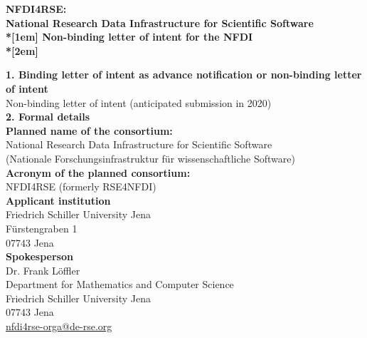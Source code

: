 \documentclass[11pt,a4paper]{scrlttr2}
\begin{document}
\newcommand{\mysec}[1]{\textbf{\hspace{-1cm}#1}\\}


\begin{letter}{}
\opening{}
\vspace{-8cm}

\begin{centering}
\textbf{\large
NFDI4RSE:\\National Research Data Infrastructure for Scientific Software\\*[1em]
Non-binding letter of intent for the NFDI\\*[2em]
}
\end{centering}

\mysec{1. Binding letter of intent as advance notification or non-binding letter of intent}

Non-binding letter of intent (anticipated submission in 2020)\\

\mysec{2. Formal details}

\textbf{Planned name of the consortium:}\\

National Research Data Infrastructure for Scientific Software\\
(Nationale Forschungsinfrastruktur für wissenschaftliche Software)\\

\textbf{Acronym of the planned consortium:}\\

NFDI4RSE (formerly RSE4NFDI)\\

\textbf{Applicant institution}\\

Friedrich Schiller University Jena\\
Fürstengraben 1\\
07743 Jena\\

\textbf{Spokesperson}\\

Dr. Frank Löffler\\
Department for Mathematics and Computer Science\\
Friedrich Schiller University Jena\\
07743 Jena\\
\href{mailto:nfdi4rse-orga@de-rse.org}{nfdi4rse-orga@de-rse.org}\\


\end{letter}
\end{document}
